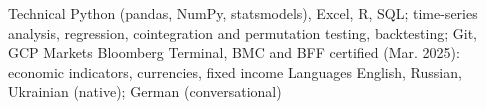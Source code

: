 \begin{cvskills}
  \cvskill
    {Technical} {Python (pandas, NumPy, statsmodels), Excel, R, SQL; time-series analysis, regression, cointegration and permutation testing, backtesting; Git, GCP}
  \cvskill
    {Markets} {Bloomberg Terminal, BMC and BFF certified (Mar. 2025): economic indicators, currencies, fixed income}
  \cvskill
    {Languages} {English, Russian, Ukrainian (native); German (conversational)}
\end{cvskills}
